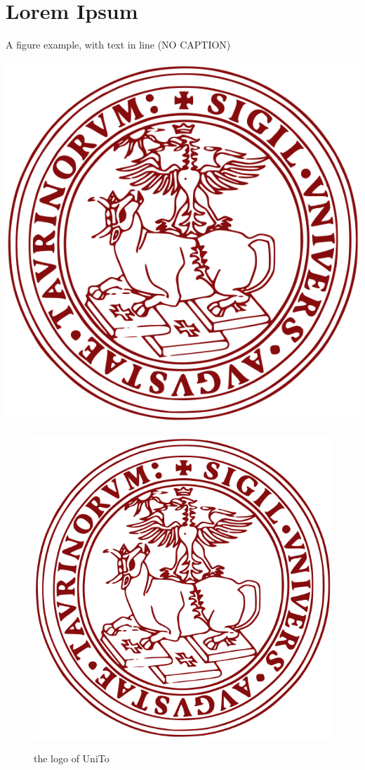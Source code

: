 \chapter[Chapter name for Index]{Lorem Ipsum}

A figure example, with text in line (NO CAPTION)
\begin{center}
\includegraphics[scale=0.15]{head/logo.png}
\label{figura0}
\end{center}


\begin{figure}
\centering
\caption{the logo of UniTo}
\includegraphics[scale=0.15]{head/logo.png}
\label{figura1}
\end{figure}


